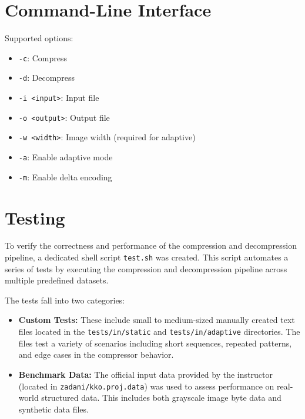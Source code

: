 \documentclass[a4paper,12pt]{article}
\begin{document}


    \section{Command-Line Interface}
    Supported options:
    \begin{itemize}
        \item \texttt{-c}: Compress
        \item \texttt{-d}: Decompress
        \item \texttt{-i <input>}: Input file
        \item \texttt{-o <output>}: Output file
        \item \texttt{-w <width>}: Image width (required for adaptive)
        \item \texttt{-a}: Enable adaptive mode
        \item \texttt{-m}: Enable delta encoding
    \end{itemize}



    \section{Testing}

    To verify the correctness and performance of the compression and decompression pipeline, a dedicated shell script \texttt{test.sh} was created. This script automates a series of tests by executing the compression and decompression pipeline across multiple predefined datasets.

    The tests fall into two categories:

    \begin{itemize}
        \item \textbf{Custom Tests:} These include small to medium-sized manually created text files located in the \texttt{tests/in/static} and \texttt{tests/in/adaptive} directories. The files test a variety of scenarios including short sequences, repeated patterns, and edge cases in the compressor behavior.

        \item \textbf{Benchmark Data:} The official input data provided by the instructor (located in \texttt{zadani/kko.proj.data}) was used to assess performance on real-world structured data. This includes both grayscale image byte data and synthetic data files.
    \end{itemize}
\end{document}
